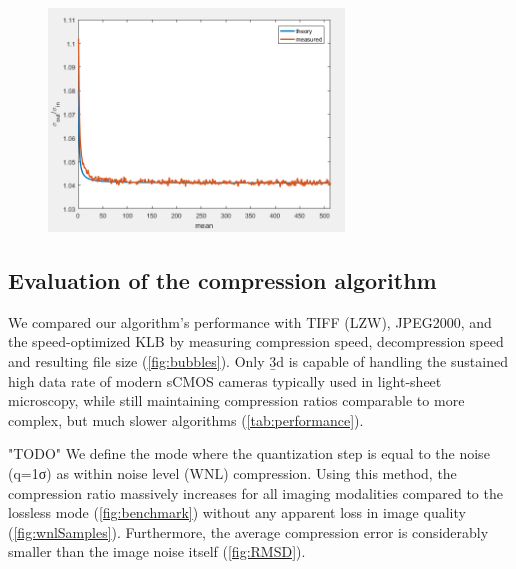     \begin{figure}
      \centering
      \includegraphics[width=0.7\textwidth]{extraNoise}
      \label{fig:extraNoise}
    \end{figure}

  \subsection{Evaluation of the compression algorithm}

  We compared our algorithm’s performance with TIFF (LZW), JPEG2000, and the speed-optimized KLB \cite{amat_efficient_2015} by measuring compression speed, decompression speed and resulting file size (\autoref{fig:bubbles}). Only \b3d is capable of handling the sustained high data rate of modern sCMOS cameras typically used in light-sheet microscopy, while still maintaining compression ratios comparable to more complex, but much slower algorithms (\autoref{tab:performance}).

  "TODO" We define the mode where the quantization step is equal to the noise (q=1σ) as within noise level (WNL) compression. Using this method, the compression ratio massively increases for all imaging modalities compared to the lossless mode (\autoref{fig:benchmark}) without any apparent loss in image quality (\autoref{fig:wnlSamples}). Furthermore, the average compression error is considerably smaller than the image noise itself (\autoref{fig:RMSD}).

